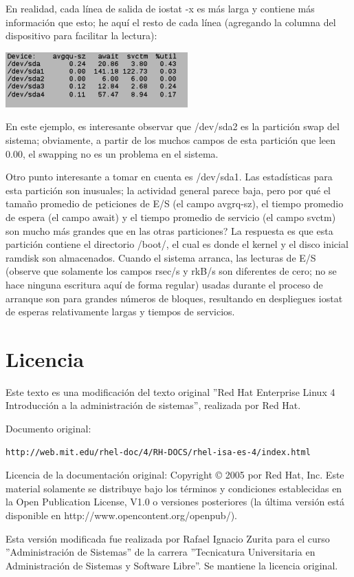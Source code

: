 \documentclass[12pt]{article}
\begin{document}
En realidad, cada línea de salida de iostat -x es más larga y contiene más información que esto; he aquí el resto de cada línea (agregando la columna del dispositivo para facilitar la lectura):

\begin{center}
 \includegraphics{iostat3.png}
\end{center}

        
En este ejemplo, es interesante observar que /dev/sda2 es la partición swap del sistema; obviamente, a partir de los muchos campos de esta partición que leen 0.00, el swapping no es un problema en el sistema.

Otro punto interesante a tomar en cuenta es /dev/sda1. Las estadísticas para esta partición son inusuales; la actividad general parece baja, pero por qué el tamaño promedio de peticiones de E/S (el campo avgrq-sz), el tiempo promedio de espera (el campo await) y el tiempo promedio de servicio (el campo svctm) son mucho más grandes que en las otras particiones? La respuesta es que esta partición contiene el directorio /boot/, el cual es donde el kernel y el disco inicial ramdisk son almacenados. Cuando el sistema arranca, las lecturas de E/S (observe que solamente los campos rsec/s y rkB/s son diferentes de cero; no se hace ninguna escritura aquí de forma regular) usadas durante el proceso de arranque son para grandes números de bloques, resultando en despliegues iostat de esperas relativamente largas y tiempos de servicios.








\section*{Licencia}

Este texto es una modificación del texto original 
''Red Hat Enterprise Linux 4
Introducción a la administración de sistemas'', realizada por Red Hat.

Documento original: 
\begin{verbatim}
http://web.mit.edu/rhel-doc/4/RH-DOCS/rhel-isa-es-4/index.html
\end{verbatim}

Licencia de la documentación original: 
Copyright © 2005 por Red Hat, Inc. Este material solamente se distribuye bajo los términos y condiciones establecidas en la Open Publication License, V1.0 o versiones posteriores (la última versión está disponible en http://www.opencontent.org/openpub/).

Esta versión modificada fue realizada por Rafael Ignacio Zurita para el curso ''Administración de Sistemas'' de la carrera
''Tecnicatura Universitaria en Administración de Sistemas y Software Libre''. Se mantiene la licencia original.
\end{document}

